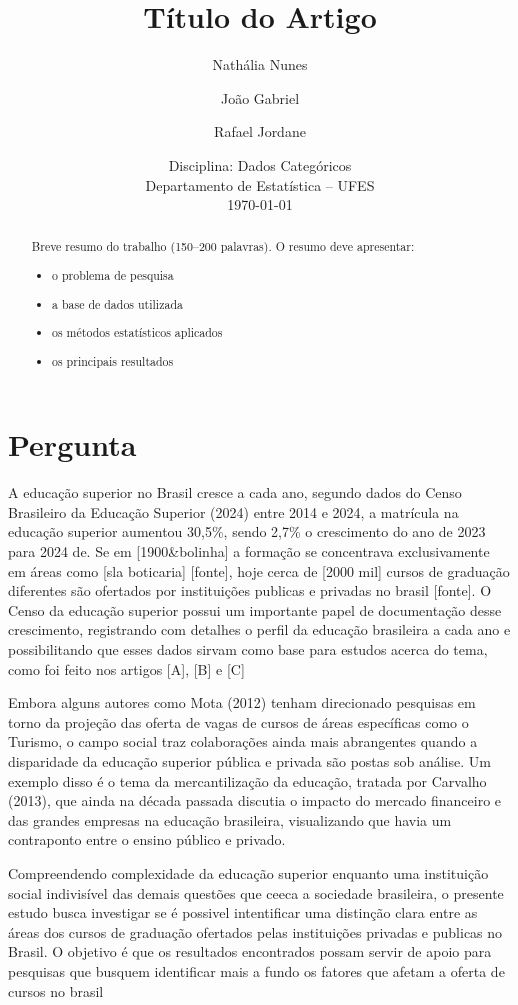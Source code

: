 \documentclass[12pt]{article}
\title{Título do Artigo}
\author{Nathália Nunes \and João Gabriel \and Rafael Jordane}
\date{Disciplina: Dados Categóricos \\
Departamento de Estatística -- UFES \\
\today}
\begin{document}
\maketitle

\begin{abstract}
Breve resumo do trabalho (150--200 palavras). O resumo deve apresentar:

\begin{itemize}
\item o problema de pesquisa
\item a base de dados utilizada
\item os métodos estatísticos aplicados
\item os principais resultados
\end{itemize}

\end{abstract}

\section{Pergunta}

A educação superior no Brasil cresce a cada ano, segundo dados do Censo Brasileiro da Educação Superior (2024) entre 2014 e 2024, a matrícula na educação superior aumentou 30,5\%, sendo 2,7\% o crescimento do ano de 2023 para 2024 de. Se em [1900\&bolinha] a formação se concentrava exclusivamente em áreas como [sla boticaria] [fonte], hoje cerca de [2000 mil] cursos de graduação diferentes são ofertados por instituições publicas e privadas no brasil [fonte]. O Censo da educação superior possui um importante papel de documentação desse crescimento, registrando com detalhes o perfil da educação brasileira a cada ano e possibilitando que esses dados sirvam como base para estudos acerca do tema, como foi feito nos artigos [A], [B] e [C]

Embora alguns autores como Mota (2012) tenham direcionado pesquisas em torno da projeção das oferta de vagas de cursos de áreas específicas como o Turismo, o campo social traz colaborações ainda mais abrangentes quando a disparidade da educação superior pública e privada são postas sob análise. Um exemplo disso é o tema da mercantilização da educação, tratada por Carvalho (2013), que ainda na década passada discutia o impacto do mercado financeiro e das grandes empresas na educação brasileira, visualizando que havia um contraponto entre o ensino público e privado.

Compreendendo complexidade da educação superior enquanto uma instituição social indivisível das demais questões que ceeca a sociedade brasileira, o presente estudo busca investigar se é possivel intentificar uma distinção clara entre as áreas dos cursos de graduação ofertados pelas instituições privadas e publicas no Brasil. O objetivo é que os resultados encontrados possam servir de apoio para pesquisas que busquem identificar mais a fundo os fatores que afetam a oferta de cursos no brasil
\end{document}
